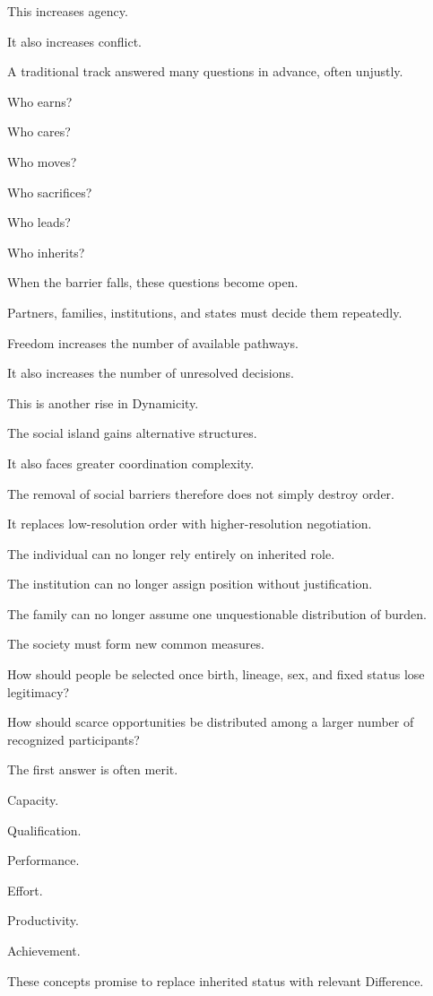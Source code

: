 This increases agency.

It also increases conflict.

A traditional track answered many questions in advance, often unjustly.

Who earns?

Who cares?

Who moves?

Who sacrifices?

Who leads?

Who inherits?

When the barrier falls, these questions become open.

Partners, families, institutions, and states must decide them repeatedly.

Freedom increases the number of available pathways.

It also increases the number of unresolved decisions.

This is another rise in Dynamicity.

The social island gains alternative structures.

It also faces greater coordination complexity.

The removal of social barriers therefore does not simply destroy order.

It replaces low-resolution order with higher-resolution negotiation.

The individual can no longer rely entirely on inherited role.

The institution can no longer assign position without justification.

The family can no longer assume one unquestionable distribution of burden.

The society must form new common measures.

How should people be selected once birth, lineage, sex, and fixed status lose legitimacy?

How should scarce opportunities be distributed among a larger number of recognized participants?

The first answer is often merit.

Capacity.

Qualification.

Performance.

Effort.

Productivity.

Achievement.

These concepts promise to replace inherited status with relevant Difference.

